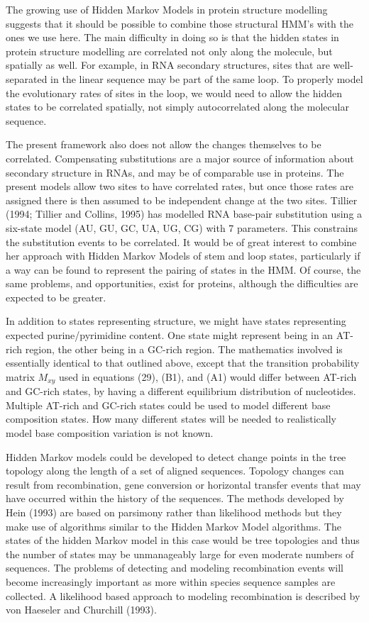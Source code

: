 \documentclass[12pt]{article}
\begin{document}
The growing use of Hidden Markov Models in protein structure modelling
suggests that it should be possible to combine those structural HMM's with
the ones we use here.  The main difficulty in doing so is that the hidden
states in protein structure modelling are correlated not only along the
molecule, but spatially as well.  For example, in RNA secondary structures,
sites that are well-separated in the linear sequence may be part of the
same loop.  To properly model the evolutionary rates of sites in the loop,
we would need to allow the hidden states to be correlated spatially, not
simply autocorrelated along the molecular sequence.

The present framework also does not allow the changes themselves to be
correlated.  Compensating substitutions are a major source of information
about secondary structure in RNAs, and may be of comparable use in proteins.
The present models allow two sites to have correlated rates, but once those
rates are assigned there is then assumed to be independent change at the
two sites.  Tillier (1994; Tillier and Collins, 1995) has modelled RNA base-pair substitution using a
six-state model (AU, GU, GC, UA, UG, CG) with 7 parameters.  This constrains
the substitution events to be correlated.  It would be of great interest to
combine her approach with Hidden Markov Models of stem and loop states,
particularly if a way can be found to represent the pairing of states in the
HMM.  Of course, the same problems, and opportunities, exist for proteins,
although the difficulties are expected to be greater.

In addition to states representing structure, we might have states
representing expected purine/pyrimidine content.  One state might represent
being in an AT-rich region, the other being in a GC-rich region.  The
mathematics involved is essentially identical to that outlined above, except
that the transition probability matrix $M_{xy}$ used in equations (29), (B1),
and (A1) would differ between AT-rich and GC-rich states, by having a different
equilibrium distribution of nucleotides.  Multiple
AT-rich and GC-rich states could be used to model different base composition
states.  How many different states will be needed to realistically
model base composition variation is not known.

Hidden Markov models could be developed to detect
change points in the tree topology along the length of a set of
aligned sequences.
Topology changes can result from recombination, gene conversion
or horizontal transfer events that may have occurred within the history
of the sequences.
The methods developed by Hein (1993) are based on parsimony 
rather than likelihood methods but they make use of
algorithms similar to the Hidden Markov Model algorithms.
The states of the hidden Markov model in this case
would be tree topologies and thus the number of states
may be unmanageably large for even moderate numbers of sequences.
The problems of detecting and modeling recombination
events will become increasingly important as more
within species sequence samples are collected.
A likelihood based approach to modeling recombination
is described by von Haeseler and Churchill (1993).
\end{document}

